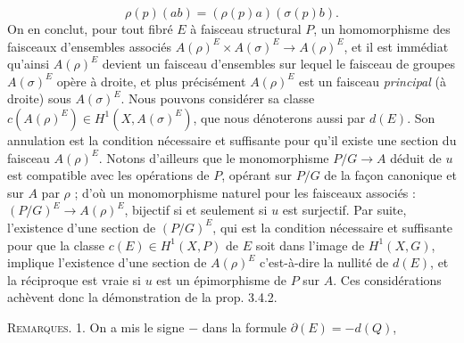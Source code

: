 \[
\rho(p)(ab)=(\rho(p)a)(\sigma(p)b).
\]
On en conclut, pour tout fibré $E$ à faisceau structural $P$, un homomorphisme
des faisceaux d'ensembles associés
$A(\rho)^E\times A(\sigma)^E\to A(\rho)^E$,
et il est immédiat qu'ainsi $A(\rho)^E$ devient un faisceau d'ensembles sur
lequel le faisceau de groupes $A(\sigma)^E$ opère à droite, et plus précisément
$A(\rho)^E$ est un faisceau \textit{principal} (à droite) sous $A(\sigma)^E$.
Nous pouvons considérer sa classe
$c(A(\rho)^E)\in H^1(X,A(\sigma)^E)$,
que nous dénoterons aussi par $d(E)$. Son annulation est la condition nécessaire
et suffisante pour qu'il existe une section du faisceau $A(\rho)^E$. Notons
d'ailleurs que le monomorphisme $P/G\to A$ déduit de $u$ est
compatible avec les opérations de $P$, opérant sur $P/G$ de la façon canonique
et sur $A$ par $\rho$ ; d'où un monomorphisme naturel pour les faisceaux
associés :
$(P/G)^E\to A(\rho)^E$,
bijectif si et seulement si $u$ est surjectif.
Par suite, l'existence d'une section de $(P/G)^E$, qui est la condition
nécessaire et suffisante pour que la classe $c(E)\in H^1(X,P)$ de $E$ soit
dans l'image de $H^1(X,G)$, implique l'existence d'une section de $A(\rho)^E$
c'est-à-dire la nullité de $d(E)$, et la réciproque est vraie si $u$ est un
épimorphisme de $P$ sur $A$. Ces considérations achèvent donc la démonstration
de la prop. 3.4.2.

\indent\textsc{Remarques.} 1. On a mis le signe $-$ dans la formule
$\partial(E)=-d(Q)$,

